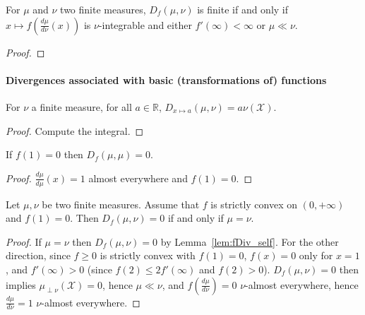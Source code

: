\begin{lemma}
  \label{lem:fDiv_ne_top_iff}
  \leanok
  For $\mu$ and $\nu$ two finite measures, $D_f(\mu, \nu)$ is finite if and only if $x \mapsto f\left(\frac{d \mu}{d \nu}(x)\right)$ is $\nu$-integrable and either $f'(\infty) < \infty$ or $\mu \ll \nu$.
\end{lemma}

\begin{proof}\leanok
\end{proof}



\paragraph{Divergences associated with basic (transformations of) functions}

\begin{lemma}
  \label{lem:fDiv_const}
  For $\nu$ a finite measure, for all $a \in \mathbb{R}$, $D_{x \mapsto a}(\mu, \nu) = a \nu(\mathcal X)$.
\end{lemma}

\begin{proof} %
Compute the integral.
\end{proof}


\begin{lemma}
  \label{lem:fDiv_self}
  \leanok
  If $f(1) = 0$ then $D_{f}(\mu, \mu) = 0$.
\end{lemma}

\begin{proof} \leanok
$\frac{d \mu}{d \mu}(x) = 1$ almost everywhere and $f(1) = 0$.
\end{proof}


\begin{lemma}
  \label{lem:fDiv_eq_zero_iff}
  \leanok
  Let $\mu, \nu$ be two finite measures. Assume that $f$ is strictly convex on $(0, +\infty)$ and $f(1) = 0$. Then $D_f(\mu, \nu) = 0$ if and only if $\mu = \nu$.
\end{lemma}

\begin{proof}\leanok
{}
If $\mu = \nu$ then $D_f(\mu, \nu) = 0$ by Lemma~\ref{lem:fDiv_self}.
For the other direction, since $f \ge 0$ is strictly convex with $f(1) = 0$, $f(x) = 0$ only for $x = 1$, and $f'(\infty) > 0$ (since $f(2) \le 2 f'(\infty)$ and $f(2) > 0$).
$D_f(\mu, \nu) = 0$ then implies $\mu_{\perp \nu}(\mathcal X) = 0$, hence $\mu \ll \nu$, and $f(\frac{d\mu}{d\nu}) = 0$ $\nu$-almost everywhere, hence $\frac{d\mu}{d\nu} = 1$ $\nu$-almost everywhere.
\end{proof}


